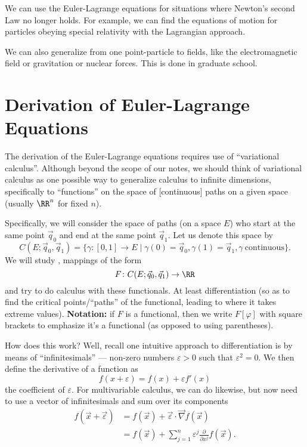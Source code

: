 We can use the Euler-Lagrange equations for situations where Newton's
second Law no longer holds. For example, we can find the equations of
motion for particles obeying special relativity with the Lagrangian
approach.

We can also generalize from one point-particle to fields, like the
electromagnetic field or gravitation or nuclear forces. This is done in
graduate school.

\section{Derivation of Euler-Lagrange Equations}

\M
The derivation of the Euler-Lagrange equations requires use of
``variational calculus''. Although beyond the scope of our notes, we
should think of variational calculus as one possible way to generalize
calculus to infinite dimensions, specifically to ``functions'' on the
space of [continuous] paths on a given space (usually $\RR^{n}$ for
fixed $n$).

Specifically, we will consider the space of paths (on a space $E$) who
start at the same point $\vec{q}_{0}$ and end at the same point
$\vec{q}_{1}$. Let us denote this space by
\begin{equation}
C(E; \vec{q}_{0},\vec{q}_{1}) = \{\gamma\colon[0,1]\to E\mid\gamma(0)=\vec{q}_{0},\gamma(1)=\vec{q}_{1},\gamma~\mbox{continuous}\}.
\end{equation}
We will study , mappings of the form
\begin{equation}
F\colon C(E; \vec{q}_{0},\vec{q}_{1})\to\RR
\end{equation}
and try to do calculus with these functionals. At least differentiation
(so as to find the critical points/``paths'' of the functional, leading
to where it takes extreme values). \textbf{Notation:} if $F$ is a
functional, then we write $F[\varphi]$ with square brackets to emphasize
it's a functional (as opposed to using parentheses).

How does this work? Well, recall one intuitive approach to
differentiation is by means of ``infinitesimals'' --- non-zero numbers
$\varepsilon>0$ such that $\varepsilon^{2}=0$. We then define the
derivative of a function as
\begin{equation}
f(x + \varepsilon) = f(x) + \varepsilon f'(x) 
\end{equation}
the coefficient of $\varepsilon$. For multivariable calculus, we can do
likewise, but now need to use a vector of infinitesimals and sum over
its components
\begin{equation}
  \begin{split}
f(\vec{x} + \vec{\varepsilon}) &= f(\vec{x}) + \vec{\varepsilon}\cdot\vec{\nabla}f(\vec{x})\\
&= f(\vec{x}) + \sum^{n}_{j=1}\varepsilon^{j}\frac{\partial}{\partial x^{j}}f(\vec{x}).
  \end{split}
\end{equation}

